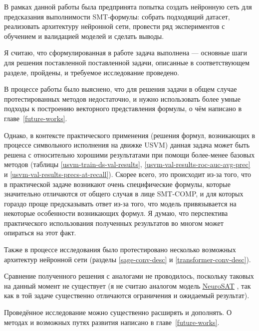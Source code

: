 
В рамках данной работы была предпринята попытка создать нейронную сеть для предсказания выполнимости SMT-формулы: собрать подходящий датасет, реализовать архитектуру нейронной сети, провести ряд экспериментов с обучением и валидацией моделей и сделать выводы.

Я считаю, что сформулированная в работе задача выполнена --- основные шаги для решения поставленной поставленной задачи, описанные в соответствующем разделе, пройдены, и требуемое исследование проведено.

В процессе работы было выяснено, что для решения задачи в общем случае протестированных методов недостаточно, и нужно использовать более умные подходы к построению векторного представления формулы, о чём написано в главе~\ref{future-works}.

Однако, в контексте практического применения (решения формул, возникающих в процессе символьного исполнения на движке USVM) данная задача может быть решена с относительно хорошими результатами при помощи более-менее базовых методов (таблицы \ref{usvm-train-ds-val-results}, \ref{usvm-val-results-roc-auc-avg-prec} и \ref{usvm-val-results-precs-at-recall}). Скорее всего, это происходит из-за того, что в практической задаче возникают очень специфические формулы, которые значительно отличаются от общего случая в лице SMT-COMP, и для которых гораздо проще предсказывать ответ из-за того, что модель привязывается на некоторые особенности возникающих формул. Я думаю, что перспектива практического использования полученных результатов во многом может опираться на этот факт.

Также в процессе исследования было протестировано несколько возможных архитектур нейронной сети (разделы \ref{sage-conv-desc} и \ref{transformer-conv-desc}).

Сравнение полученного решения с аналогами не проводилось, поскольку таковых на данный момент не существует (я не считаю аналогом модель \hyperref[neurosat]{\underline{NeuroSAT}} \cite{neurosat-paper}, так как в той задаче существенно отличаются ограничения и ожидаемый результат).

Проведённое исследование можно существенно расширять и дополнять. О методах и возможных путях развития написано в главе~\ref{future-works}.
